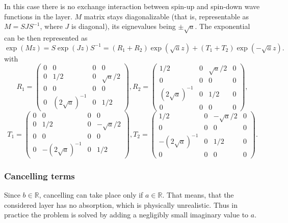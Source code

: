 \documentclass[12pt,a4paper]{article}
\begin{document}
In this case there is no exchange interaction between spin-up and spin-down wave functions in the layer. $M$ matrix
stays diagonalizable (that is, representable as $M = S J S^{-1}$, where $J$ is diagonal), its eignevalues being $\pm \sqrt{a}$. The exponential can be then represented as
\begin{equation*}
\exp{(Mz)} = S \exp{(J z)} S^{-1} = (R_1 + R_2) \exp{(\sqrt{a} z)} + (T_1 + T_2) \exp{(-\sqrt{a} z)}.
\end{equation*}
with
\begin{equation*}
R_1
=
\left(
\begin{matrix}
	0	&	0	&	0	&	0 \\
	0	&	1/2	&	0	&	\sqrt{a}/2 \\
	0	&	0	&	0	&	0 \\
	0	&	(2\sqrt{a})^{-1}	&	0	&	1/2
\end{matrix}
\right),
R_2
=
\left(
\begin{matrix}
	1/2	&	0	&	\sqrt{a}/2	&	0 \\
	0	&	0	&	0	&	0 \\
	(2\sqrt{a})^{-1}	&	0	&	1/2	&	0 \\
	0	&	0	&	0	&	0
\end{matrix}
\right),
\end{equation*}
\begin{equation*}
T_1
=
\left(
\begin{matrix}
	0	&	0	&	0	&	0 \\
	0	&	1/2	&	0	&	-\sqrt{a}/2 \\
	0	&	0	&	0	&	0 \\
	0	&	-(2\sqrt{a})^{-1}	&	0	&	1/2
\end{matrix}
\right),
T_2
=
\left(
\begin{matrix}
	1/2	&	0	&	-\sqrt{a}/2	&	0 \\
	0	&	0	&	0	&	0 \\
	-(2\sqrt{a})^{-1}	&	0	&	1/2	&	0 \\
	0	&	0	&	0	&	0
\end{matrix}
\right).
\end{equation*}

\subsubsection{Cancelling terms}

Since $b \in \mathbb{R}$, cancelling can take place only if $a \in \mathbb{R}$. That means, that the considered layer has no absorption, which is physically unrealistic. Thus in practice the problem is solved by adding a negligibly small imaginary value to $a$. 
\end{document}
